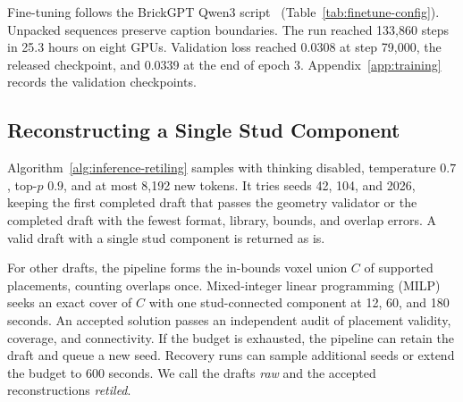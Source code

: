 Fine-tuning follows the BrickGPT Qwen3 script~\cite{brickgpt} (Table~\ref{tab:finetune-config}). Unpacked sequences preserve caption boundaries. The run reached 133,860 steps in 25.3 hours on eight GPUs. Validation loss reached 0.0308 at step 79,000, the released checkpoint, and 0.0339 at the end of epoch 3. Appendix~\ref{app:training} records the validation checkpoints.


\subsection{Reconstructing a Single Stud Component}
Algorithm~\ref{alg:inference-retiling} samples with thinking disabled, temperature $0.7$, top-$p$ $0.9$, and at most 8,192 new tokens. It tries seeds 42, 104, and 2026, keeping the first completed draft that passes the geometry validator or the completed draft with the fewest format, library, bounds, and overlap errors. A valid draft with a single stud component is returned as is.

For other drafts, the pipeline forms the in-bounds voxel union $C$ of supported placements, counting overlaps once. Mixed-integer linear programming (MILP) seeks an exact cover of $C$ with one stud-connected component at 12, 60, and 180 seconds. An accepted solution passes an independent audit of placement validity, coverage, and connectivity. If the budget is exhausted, the pipeline can retain the draft and queue a new seed. Recovery runs can sample additional seeds or extend the budget to 600 seconds. We call the drafts \emph{raw} and the accepted reconstructions \emph{retiled}.
